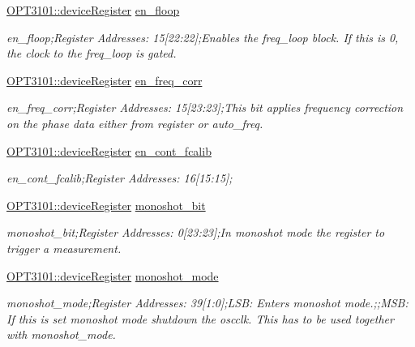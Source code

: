\begin{DoxyCompactItemize}
\mbox{\hyperlink{class_o_p_t3101_1_1device_register}{O\+P\+T3101\+::device\+Register}} \mbox{\hyperlink{class_o_p_t3101_1_1registers_acac402a36d4a6b3e8447cbfea307f46e}{en\+\_\+floop}}
\begin{DoxyCompactList}\small\item\em en\+\_\+floop;Register Addresses\+: 15\mbox{[}22\+:22\mbox{]};Enables the freq\+\_\+loop block. If this is \textquotesingle{}0\textquotesingle{}, the clock to the freq\+\_\+loop is gated. \end{DoxyCompactList}\item 
\mbox{\hyperlink{class_o_p_t3101_1_1device_register}{O\+P\+T3101\+::device\+Register}} \mbox{\hyperlink{class_o_p_t3101_1_1registers_a7d1b46e26e943ba29294904855c83871}{en\+\_\+freq\+\_\+corr}}
\begin{DoxyCompactList}\small\item\em en\+\_\+freq\+\_\+corr;Register Addresses\+: 15\mbox{[}23\+:23\mbox{]};This bit applies frequency correction on the phase data either from register or auto\+\_\+freq. \end{DoxyCompactList}\item 
\mbox{\hyperlink{class_o_p_t3101_1_1device_register}{O\+P\+T3101\+::device\+Register}} \mbox{\hyperlink{class_o_p_t3101_1_1registers_aa138ff880edecfdc53ef83bf2cc0dcb8}{en\+\_\+cont\+\_\+fcalib}}
\begin{DoxyCompactList}\small\item\em en\+\_\+cont\+\_\+fcalib;Register Addresses\+: 16\mbox{[}15\+:15\mbox{]}; \end{DoxyCompactList}\item 
\mbox{\hyperlink{class_o_p_t3101_1_1device_register}{O\+P\+T3101\+::device\+Register}} \mbox{\hyperlink{class_o_p_t3101_1_1registers_a158b270484e2829a304f13e30dec3390}{monoshot\+\_\+bit}}
\begin{DoxyCompactList}\small\item\em monoshot\+\_\+bit;Register Addresses\+: 0\mbox{[}23\+:23\mbox{]};In monoshot mode the register to trigger a measurement. \end{DoxyCompactList}\item 
\mbox{\hyperlink{class_o_p_t3101_1_1device_register}{O\+P\+T3101\+::device\+Register}} \mbox{\hyperlink{class_o_p_t3101_1_1registers_adb2df2fa5f4a83807458958db5ee71eb}{monoshot\+\_\+mode}}
\begin{DoxyCompactList}\small\item\em monoshot\+\_\+mode;Register Addresses\+: 39\mbox{[}1\+:0\mbox{]};L\+SB\+: Enters monoshot mode.;;M\+SB\+: If this is set monoshot mode shutdown the oscclk. This has to be used together with monoshot\+\_\+mode. \end{DoxyCompactList}\item 

\end{DoxyCompactItemize}
